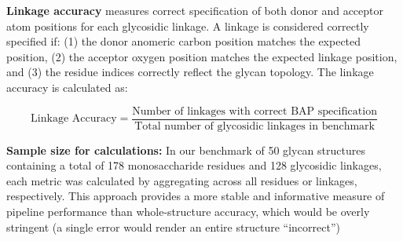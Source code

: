 \textbf{Linkage accuracy} measures correct specification of both donor and acceptor atom positions for each glycosidic linkage. A linkage is considered correctly specified if: (1) the donor anomeric carbon position matches the expected position, (2) the acceptor oxygen position matches the expected linkage position, and (3) the residue indices correctly reflect the glycan topology. The linkage accuracy is calculated as:

\begin{equation}
\text{Linkage Accuracy} = \frac{\text{Number of linkages with correct BAP specification}}{\text{Total number of glycosidic linkages in benchmark}}
\end{equation}

\textbf{Sample size for calculations:} In our benchmark of 50 glycan structures containing a total of 178 monosaccharide residues and 128 glycosidic linkages, each metric was calculated by aggregating across all residues or linkages, respectively. This approach provides a more stable and informative measure of pipeline performance than whole-structure accuracy, which would be overly stringent (a single error would render an entire structure ``incorrect'')
